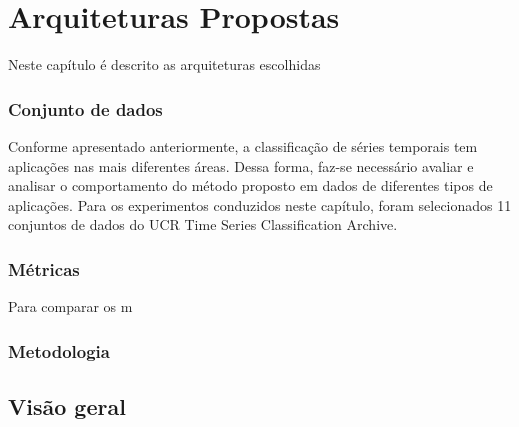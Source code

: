 \chapter{Arquiteturas Propostas} \label{cap3}

Neste capítulo é descrito as arquiteturas escolhidas 


\subsection{Conjunto de dados}

Conforme apresentado anteriormente, a classificação de séries temporais tem aplicações nas mais diferentes áreas. Dessa forma, faz-se necessário avaliar e analisar o comportamento do método proposto em dados de diferentes tipos de aplicações. Para os experimentos conduzidos neste capítulo, foram selecionados 11 conjuntos de dados do UCR Time Series Classification Archive\cite{UCRArchive}. 

\subsection{Métricas}
Para comparar os m
\subsection{Metodologia}


\section{Visão geral}




